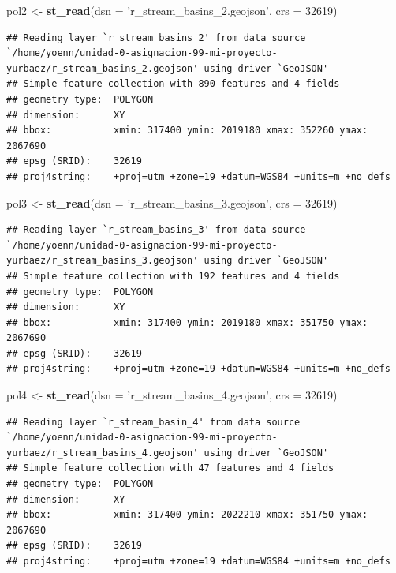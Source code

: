 \documentclass[11pt,]{article}
\newenvironment{Shaded}{\begin{snugshade}}{\end{snugshade}}
\newcommand{\KeywordTok}[1]{\textcolor[rgb]{0.13,0.29,0.53}{\textbf{#1}}}
\newcommand{\DataTypeTok}[1]{\textcolor[rgb]{0.13,0.29,0.53}{#1}}
\newcommand{\DecValTok}[1]{\textcolor[rgb]{0.00,0.00,0.81}{#1}}
\newcommand{\StringTok}[1]{\textcolor[rgb]{0.31,0.60,0.02}{#1}}
\newcommand{\NormalTok}[1]{#1}
\begin{document}
\begin{Shaded}
\begin{Highlighting}[]
\NormalTok{pol2 <-}\StringTok{ }\KeywordTok{st_read}\NormalTok{(}\DataTypeTok{dsn =} \StringTok{'r_stream_basins_2.geojson'}\NormalTok{, }\DataTypeTok{crs =} \DecValTok{32619}\NormalTok{)}
\end{Highlighting}
\end{Shaded}

\begin{verbatim}
## Reading layer `r_stream_basins_2' from data source `/home/yoenn/unidad-0-asignacion-99-mi-proyecto-yurbaez/r_stream_basins_2.geojson' using driver `GeoJSON'
## Simple feature collection with 890 features and 4 fields
## geometry type:  POLYGON
## dimension:      XY
## bbox:           xmin: 317400 ymin: 2019180 xmax: 352260 ymax: 2067690
## epsg (SRID):    32619
## proj4string:    +proj=utm +zone=19 +datum=WGS84 +units=m +no_defs
\end{verbatim}

\begin{Shaded}
\begin{Highlighting}[]
\NormalTok{pol3 <-}\StringTok{ }\KeywordTok{st_read}\NormalTok{(}\DataTypeTok{dsn =} \StringTok{'r_stream_basins_3.geojson'}\NormalTok{, }\DataTypeTok{crs =} \DecValTok{32619}\NormalTok{)}
\end{Highlighting}
\end{Shaded}

\begin{verbatim}
## Reading layer `r_stream_basins_3' from data source `/home/yoenn/unidad-0-asignacion-99-mi-proyecto-yurbaez/r_stream_basins_3.geojson' using driver `GeoJSON'
## Simple feature collection with 192 features and 4 fields
## geometry type:  POLYGON
## dimension:      XY
## bbox:           xmin: 317400 ymin: 2019180 xmax: 351750 ymax: 2067690
## epsg (SRID):    32619
## proj4string:    +proj=utm +zone=19 +datum=WGS84 +units=m +no_defs
\end{verbatim}

\begin{Shaded}
\begin{Highlighting}[]
\NormalTok{pol4 <-}\StringTok{ }\KeywordTok{st_read}\NormalTok{(}\DataTypeTok{dsn =} \StringTok{'r_stream_basins_4.geojson'}\NormalTok{, }\DataTypeTok{crs =} \DecValTok{32619}\NormalTok{)}
\end{Highlighting}
\end{Shaded}

\begin{verbatim}
## Reading layer `r_stream_basin_4' from data source `/home/yoenn/unidad-0-asignacion-99-mi-proyecto-yurbaez/r_stream_basins_4.geojson' using driver `GeoJSON'
## Simple feature collection with 47 features and 4 fields
## geometry type:  POLYGON
## dimension:      XY
## bbox:           xmin: 317400 ymin: 2022210 xmax: 351750 ymax: 2067690
## epsg (SRID):    32619
## proj4string:    +proj=utm +zone=19 +datum=WGS84 +units=m +no_defs
\end{verbatim}
\end{document}
